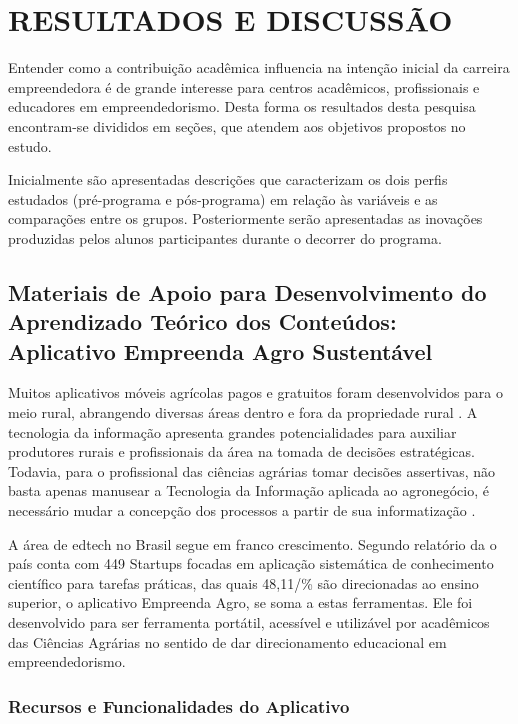 \chapter{RESULTADOS E DISCUSSÃO}

Entender como a contribuição acadêmica influencia na intenção inicial da carreira empreendedora é de grande interesse para centros acadêmicos, profissionais e educadores em empreendedorismo. Desta forma os resultados desta pesquisa encontram-se divididos em seções, que atendem aos objetivos propostos no estudo.

Inicialmente são apresentadas descrições que caracterizam os dois perfis estudados (pré-programa e pós-programa) em relação às variáveis e as comparações entre os grupos. Posteriormente serão apresentadas as inovações produzidas pelos alunos participantes durante o decorrer do programa.



\section{Materiais de Apoio para Desenvolvimento do Aprendizado Teórico dos Conteúdos: Aplicativo Empreenda Agro Sustentável}



Muitos aplicativos móveis agrícolas pagos e gratuitos foram desenvolvidos para o meio rural, abrangendo diversas áreas dentro e fora da propriedade rural \cite{silva_environment_2015}. A tecnologia da informação apresenta grandes potencialidades para auxiliar produtores rurais e profissionais da área na tomada de decisões estratégicas. Todavia, para o profissional das ciências agrárias tomar decisões assertivas, não basta apenas manusear a Tecnologia da Informação aplicada ao agronegócio, é necessário mudar a concepção dos processos a partir de sua informatização \cite{ferraz_tecnologia_2017}.

A área de edtech no Brasil segue em franco crescimento. Segundo relatório da  o país conta com 449 Startups focadas em aplicação sistemática de conhecimento científico para tarefas práticas, das quais 48,11/\% são direcionadas ao ensino superior, o aplicativo Empreenda Agro, se soma a estas ferramentas. Ele foi desenvolvido para ser ferramenta portátil, acessível e utilizável por acadêmicos das Ciências Agrárias no sentido de dar direcionamento educacional em empreendedorismo.

\subsection{Recursos e Funcionalidades do Aplicativo}

